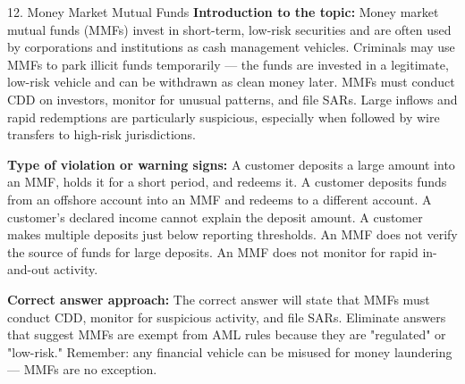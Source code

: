 \documentclass[11pt,a4paper]{beamer}
\begin{document}
\begin{frame}{12. Money Market Mutual Funds}
\tiny
\noindent\textbf{Introduction to the topic:} Money market mutual funds (MMFs) invest in short-term, low-risk securities and are often used by corporations and institutions as cash management vehicles. Criminals may use MMFs to park illicit funds temporarily — the funds are invested in a legitimate, low-risk vehicle and can be withdrawn as clean money later. MMFs must conduct CDD on investors, monitor for unusual patterns, and file SARs. Large inflows and rapid redemptions are particularly suspicious, especially when followed by wire transfers to high-risk jurisdictions.

\vspace{0.1cm}
\noindent\textbf{Type of violation or warning signs:} A customer deposits a large amount into an MMF, holds it for a short period, and redeems it. A customer deposits funds from an offshore account into an MMF and redeems to a different account. A customer's declared income cannot explain the deposit amount. A customer makes multiple deposits just below reporting thresholds. An MMF does not verify the source of funds for large deposits. An MMF does not monitor for rapid in-and-out activity.

\vspace{0.1cm}
\noindent\textbf{Correct answer approach:} The correct answer will state that MMFs must conduct CDD, monitor for suspicious activity, and file SARs. Eliminate answers that suggest MMFs are exempt from AML rules because they are "regulated" or "low-risk." Remember: any financial vehicle can be misused for money laundering — MMFs are no exception.
\end{frame}
\end{document}
